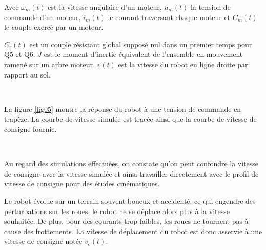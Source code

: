 Avec $\omega_m(t)$ est la vitesse angulaire d'un moteur, $u_m(t)$ la tension de commande d'un moteur, $i_m(t)$ le courant traversant chaque moteur et $C_m(t)$ le couple exercé par un moteur.

$C_r(t)$ est un couple résistant global supposé nul dans un premier temps pour Q5 et Q6. $J$ est le moment d'inertie équivalent de l'ensemble en mouvement ramené sur un arbre moteur. $v(t)$ est la vitesse du robot en ligne droite par rapport au sol.


~\

La figure \ref{fig05} montre la réponse du robot à une tension de commande en trapèze. La courbe de vitesse simulée est tracée ainsi que la courbe de vitesse de consigne fournie.


~\

Au regard des simulations effectuées, on constate qu'on peut confondre la vitesse de consigne avec la vitesse simulée et ainsi travailler directement avec le profil de vitesse de consigne pour des études cinématiques.

Le robot évolue sur un terrain souvent boueux et accidenté, ce qui engendre des perturbations sur les roues, le robot ne se déplace alors plus à la vitesse souhaitée. De plus, pour des courants trop faibles, les roues ne tournent pas à cause des frottements. La vitesse de déplacement du robot est donc asservie à une vitesse de consigne notée $v_c(t)$.

\newpage

